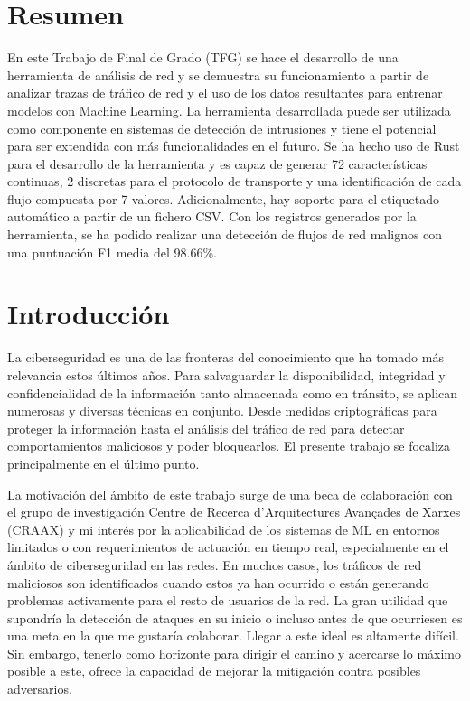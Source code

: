 \documentclass[10pt,a4paper,twoside]{article}
\begin{document}
\begin{multicols}{2}
    \section*{Resumen}

    En este Trabajo de Final de Grado (TFG) se hace el desarrollo de una herramienta de análisis de red y se demuestra su funcionamiento a partir de analizar trazas de tráfico de red y el uso de los datos resultantes para entrenar modelos con Machine Learning. La herramienta desarrollada puede ser utilizada como componente en sistemas  de detección de intrusiones y tiene el potencial para ser extendida con más funcionalidades en el futuro. Se ha hecho uso de Rust para el desarrollo de la herramienta y es capaz de generar 72 características continuas, 2 discretas para el protocolo de transporte y una identificación de cada flujo compuesta por 7 valores. Adicionalmente, hay soporte para el etiquetado automático a partir de un fichero CSV. Con los registros generados por la herramienta, se ha podido realizar una detección de flujos de red malignos con una puntuación F1 media del 98.66\%.

    \section{Introducción}

    La ciberseguridad es una de las fronteras del conocimiento que ha tomado más relevancia estos últimos años. Para salvaguardar la disponibilidad, integridad y confidencialidad de la información tanto almacenada como en tránsito, se aplican numerosas y diversas técnicas en conjunto. Desde medidas criptográficas para proteger la información hasta el análisis del tráfico de red para detectar comportamientos maliciosos y poder bloquearlos. El presente trabajo se focaliza principalmente en el último punto.

    La motivación del ámbito de este trabajo surge de una beca de colaboración con el grupo de investigación Centre de Recerca d'Arquitectures Avançades de Xarxes (CRAAX) y mi interés por la aplicabilidad de los sistemas de ML en entornos limitados o con requerimientos de actuación en tiempo real, especialmente en el ámbito de ciberseguridad en las redes. En muchos casos, los tráficos de red maliciosos son identificados cuando estos ya han ocurrido o están generando problemas activamente para el resto de usuarios de la red. La gran utilidad que supondría la detección de ataques en su inicio o incluso antes de que ocurriesen es una meta en la que me gustaría colaborar. Llegar a este ideal es altamente difícil. Sin embargo, tenerlo como horizonte para dirigir el camino y acercarse lo máximo posible a este, ofrece la capacidad de mejorar la mitigación contra posibles adversarios.


\end{multicols}
\end{document}
